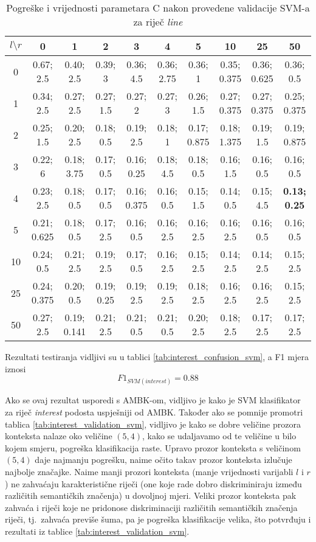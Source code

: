 \documentclass[10pt, a4paper]{article}
\begin{document}
\begin{table*}[!hbtp]
\caption{Pogreške i vrijednosti parametara C nakon provedene validacije SVM-a za riječ \emph{line}}
\label{tab:line_validation_svm}
\begin{center}
\begin{tabular}{|c|ccccccccc|}
\hline
$l \setminus r$ & 0 & 1 & 2 & 3 & 4 & 5 & 10 & 25 & 50 \\
\hline
0 & 0.67; 2.5 & 0.40; 2.5 & 0.39; 3 & 0.36; 4.5 & 0.36; 2.75 & 0.36; 1 & 0.35; 0.375 & 0.36; 0.625 & 0.36; 0.5 \\
1 & 0.34; 2.5 & 0.27; 2.5 & 0.27; 1.5 & 0.27; 2 & 0.27; 3 & 0.26; 1.5 & 0.27; 0.375 & 0.27; 0.375 & 0.25; 0.375 \\
2 & 0.25; 1.5 & 0.20; 2.5 & 0.18; 0.5 & 0.19; 2.5 & 0.18; 1 & 0.17; 0.875 & 0.18; 1.375 & 0.19; 1.5 & 0.19; 0.875 \\
3 & 0.22; 6 & 0.18; 3.75 & 0.17; 0.5 & 0.16; 0.25 & 0.18; 4.5 & 0.18; 0.5 & 0.16; 1.5 & 0.16; 0.5 & 0.16; 0.5 \\
4 & 0.23; 2.5 & 0.18; 0.5 & 0.17; 0.5 & 0.16; 0.375 & 0.16; 0.5 & 0.15; 1.5 & 0.14; 0.5 & 0.15; 4.5 & \textbf{0.13; 0.25} \\
5 & 0.21; 0.625 & 0.18; 0.5 & 0.17; 2.5 & 0.16; 0.5 & 0.16; 2.5 & 0.16; 2.5 & 0.16; 2.5 & 0.16; 0.5 & 0.16; 0.5 \\
10 & 0.24; 0.5 & 0.21; 2.5 & 0.19; 2.5 & 0.17; 0.5 & 0.16; 2.5 & 0.15; 2.5 & 0.14; 2.5 & 0.14; 2.5 & 0.15; 2.5 \\
25 & 0.24; 0.375 & 0.20; 0.5 & 0.19; 0.25 & 0.19; 2.5 & 0.19; 2.5 & 0.18; 2.5 & 0.16; 2.5 & 0.16; 2.5 & 0.15; 2.5 \\
50 & 0.27; 2.5 & 0.19; 0.141 & 0.21; 2.5 & 0.21; 0.5 & 0.21; 0.5 & 0.20; 2.5 & 0.18; 2.5 & 0.17; 2.5 & 0.17; 2.5 \\
\hline
\end{tabular}
\end{center}
\end{table*}
Rezultati testiranja vidljivi su u tablici \ref{tab:interest_confusion_svm},
a F1 mjera iznosi
\begin{equation}
\label{eq:f1_svm_interest}
F1_{SVM(interest)} = 0.88
\end{equation}

Ako se ovaj rezultat usporedi s AMBK-om, vidljivo je kako je SVM klasifikator za riječ \emph{interest} podosta uspješniji od AMBK.
Također ako se pomnije promotri tablica \ref{tab:interest_validation_svm}, vidljivo je kako se dobre veličine
prozora konteksta nalaze oko veličine $(5,4)$, 
kako se udaljavamo od te veličine u bilo kojem smjeru, pogreška klasifikacija raste.
Upravo prozor konteksta s veličinom $(5, 4)$ daje najmanju pogrešku,
naime očito takav prozor konteksta izlučuje najbolje značajke.
Naime manji prozori konteksta (manje vrijednosti varijabli $l$ i $r$) 
ne zahvaćaju karakteristične riječi (one koje rade dobro diskriminiraju između različitih semantičkih značenja) u dovoljnoj mjeri.
Veliki prozor konteksta pak zahvaća i riječi koje ne pridonose diskriminaciji
različitih semantičkih značenja riječi, tj.~zahvaća previše šuma, pa je
pogreška klasifikacije velika, što potvrđuju i rezultati iz tablice \ref{tab:interest_validation_svm}.
\end{document}
